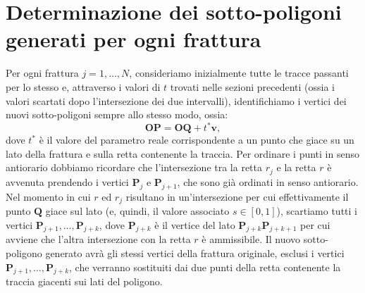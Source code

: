 \documentclass[a4paper]{article}
\newcommand{\B}{\mathbf}
\begin{document}
\section{Determinazione dei sotto-poligoni generati per ogni frattura}
Per ogni frattura $j=1,\dots,N$, consideriamo inizialmente tutte le tracce passanti per lo stesso e, attraverso i valori di $t$ trovati nelle sezioni precedenti (ossia i valori scartati dopo l'intersezione dei due intervalli), identifichiamo i vertici dei nuovi sotto-poligoni sempre allo stesso modo, ossia:$$\B{OP}=\B{OQ}+t^*\B{v},$$ dove $t^*$ è il valore del parametro reale corrispondente a un punto che giace su un lato della frattura e sulla retta contenente la traccia. Per ordinare i punti in senso antiorario dobbiamo ricordare che l'intersezione tra la retta $r_j$ e la retta $r$ è avvenuta prendendo i vertici $\B{P}_j$ e $\B{P}_{j+1}$, che sono già ordinati in senso antiorario. Nel momento in cui $r$ ed $r_j$ risultano in un'intersezione per cui effettivamente il punto $\B{Q}$ giace sul lato (e, quindi, il valore associato $s\in[0,1]$), scartiamo tutti i vertici $\B{P}_{j+1},\dots,\B{P}_{j+k}$, dove $\B{P}_{j+k}$ è il vertice del lato $\B{P}_{j+k}\B{P}_{j+k+1}$ per cui avviene che l'altra intersezione con la retta $r$ è ammissibile. Il nuovo sotto-poligono generato avrà gli stessi vertici della frattura originale, esclusi i vertici $\B{P}_{j+1},\dots,\B{P}_{j+k}$, che verranno sostituiti dai due punti della retta contenente la traccia giacenti sui lati del poligono. 
\end{document}
